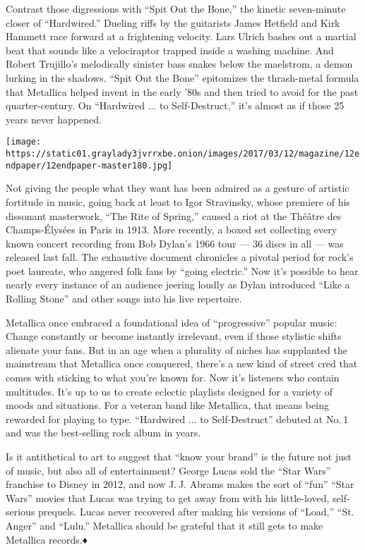 Contrast those digressions with ``Spit Out the Bone,'' the kinetic
seven-minute closer of ``Hardwired.'' Dueling riffs by the guitarists
James Hetfield and Kirk Hammett race forward at a frightening velocity.
Lars Ulrich bashes out a martial beat that sounds like a velociraptor
trapped inside a washing machine. And Robert Trujillo's melodically
sinister bass snakes below the maelstrom, a demon lurking in the
shadows. ``Spit Out the Bone'' epitomizes the thrash-metal formula that
Metallica helped invent in the early '80s and then tried to avoid for
the past quarter-century. On ``Hardwired ... to Self-Destruct,'' it's
almost as if those 25 years never happened.

\texttt{[image: https://static01.graylady3jvrrxbe.onion/images/2017/03/12/magazine/12endpaper/12endpaper-master180.jpg]}

Not giving the people what they want has been admired as a gesture of
artistic fortitude in music, going back at least to Igor Stravinsky,
whose premiere of his dissonant masterwork, ``The Rite of Spring,''
caused a riot at the Théâtre des Champs-Élysées in Paris in 1913. More
recently, a boxed set collecting every known concert recording from Bob
Dylan's 1966 tour --- 36 discs in all --- was released last fall. The
exhaustive document chronicles a pivotal period for rock's poet
laureate, who angered folk fans by ``going electric.'' Now it's possible
to hear nearly every instance of an audience jeering loudly as Dylan
introduced ``Like a Rolling Stone'' and other songs into his live
repertoire.

Metallica once embraced a foundational idea of ``progressive'' popular
music: Change constantly or become instantly irrelevant, even if those
stylistic shifts alienate your fans. But in an age when a plurality of
niches has supplanted the mainstream that Metallica once conquered,
there's a new kind of street cred that comes with sticking to what
you're known for. Now it's listeners who contain multitudes. It's up to
us to create eclectic playlists designed for a variety of moods and
situations. For a veteran band like Metallica, that means being rewarded
for playing to type. ``Hardwired ... to Self-Destruct'' debuted at No. 1
and was the best-selling rock album in years.

Is it antithetical to art to suggest that ``know your brand'' is the
future not just of music, but also all of entertainment? George Lucas
sold the ``Star Wars'' franchise to Disney in 2012, and now J. J. Abrams
makes the sort of ``fun'' ``Star Wars'' movies that Lucas was trying to
get away from with his little-loved, self-serious prequels. Lucas never
recovered after making his versions of ``Load,'' ``St. Anger'' and
``Lulu.'' Metallica should be grateful that it still gets to make
Metallica records.♦

